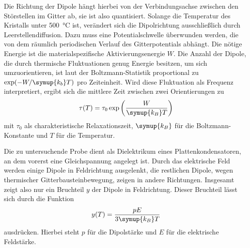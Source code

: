 Die Richtung der Dipole hängt hierbei von der Verbindungsachse zwischen den Störstellen im Gitter ab, sie ist also quantisiert.
Solange die Temperatur des Kristalls unter \SI{500}{\celsius} ist, verändert sich die Dipolrichtung ausschließlich durch Leerstellendiffusion.
Dazu muss eine Potentialschwelle überwunden werden, die von dem räumlich periodischen Verlauf des Gitterpotentials abhängt.
Die nötige Energie ist die materialspezifische Aktivierungsenergie $W$.
Die Anzahl der Dipole, die durch thermische Fluktuationen genug Energie besitzen, um sich umzuorientieren, ist laut der Boltzmann-Statistik proportional zu $\exp(-W/\symup{k_b}T)$ pro Zeiteinheit.
Wird diese Fluktuation als Frequenz interpretiert, ergibt sich die mittlere Zeit zwischen zwei Orientierungen zu
\begin{equation}
    \label{eqn:Relaxzeit}
    \tau(T) = \tau_0 \exp\left(\frac{W}{\symup{k_B} T}\right)
\end{equation}
mit $\tau_0$ als charakteristische Relaxationszeit, $\symup{k_B}$ für die Boltzmann-Konstante und $T$ für die Temperatur.

Die zu untersuchende Probe dient als Dielektrikum eines Plattenkondensatoren, an dem vorerst eine Gleichspannung angelegt ist.
Durch das elektrische Feld werden einige Dipole in Feldrichtung ausgelenkt, die restlichen Dipole, wegen thermischer Gitterbausteinbewegung, zeigen
in andere Richtungen. Insgesamt zeigt also nur ein Bruchteil $y$ der Dipole in Feldrichtung.
Dieser Bruchteil lässt sich durch die Funktion
\begin{equation}
    \label{:eqn:dipolgesamtheit}
    y(T)=\frac{pE}{3\symup{k_B}T}
\end{equation}
ausdrücken.
Hierbei steht $p$ für die Dipolstärke und $E$ für die elektrische Feldstärke.

